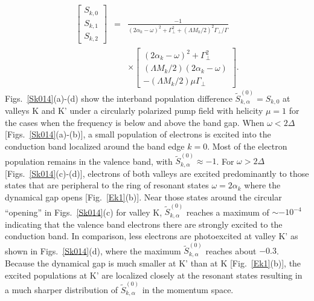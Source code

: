 \documentclass[reprint,amsmath,amssymb,aps,prb]{revtex4-1}
\begin{document}
\begin{eqnarray}
\left[\begin{array}{c}
        S_{k,0}\\
        S_{k,1} \\
        S_{k,2}\end{array}\right] 
  &=& \frac{-1}{\left(2\alpha_k - \omega\right)^2 + \Gamma_\perp^2 + {({\Lambda M_k}/{2})}^2 {\Gamma_\perp}/{\Gamma}} \nonumber \\
      &&\times\left[\begin{array}{c}
                                                                                                                                                             \left(2\alpha_k - \omega\right)^2 + \Gamma_\perp^2 \\
                                                                                                                                                             (\Lambda M_k/2)(2\alpha_k - \omega) \\
                                                                                                                                                             -(\Lambda M_k/2) \mu\Gamma_\perp \end{array}\right]. 
\label{Sk123}
\end{eqnarray}
%
Figs.~\ref{Sk014}(a)-(d) show the interband population difference $\tilde{S}_{k,\alpha}^{(0)} = S_{k,0}$ at valleys K and K' under a circularly polarized pump field with helicity $\mu = 1$ for the cases when the frequency is below and above the band gap. When $\omega < 2\Delta$ [Figs.~\ref{Sk014}(a)-(b)], a small population of electrons is excited into the conduction band localized around the band edge $k = 0$. Most of the electron population remains in the valence band, with $\tilde{S}_{k,\alpha}^{(0)} \approx -1$. For $\omega > 2\Delta$ [Figs.~\ref{Sk014}(c)-(d)], electrons of both valleys are excited predominantly
to those states that are peripheral to
the ring of resonant states $\omega = 2\alpha_k$ where the dynamical gap opens [Fig.~\ref{Ek1}(b)]. Near those states around the circular ``opening'' in Figs.~\ref{Sk014}(c) for valley K, $\tilde{S}_{k,\alpha}^{(0)}$ reaches a maximum of  $\sim -10^{-4}$ indicating that the valence band electrons there are strongly excited to the conduction band.
In comparison, less electrons are photoexcited at valley K' as shown in Figs.~\ref{Sk014}(d), where the maximum $\tilde{S}_{k,\alpha}^{(0)}$ reaches about $-0.3$. Because the dynamical gap is much smaller at K' than at K [Fig.~\ref{Ek1}(b)], the excited populations at K' are localized closely at the resonant states resulting in a much sharper distribution of $\tilde{S}_{k,\alpha}^{(0)}$ in the momentum space. 
\end{document}
